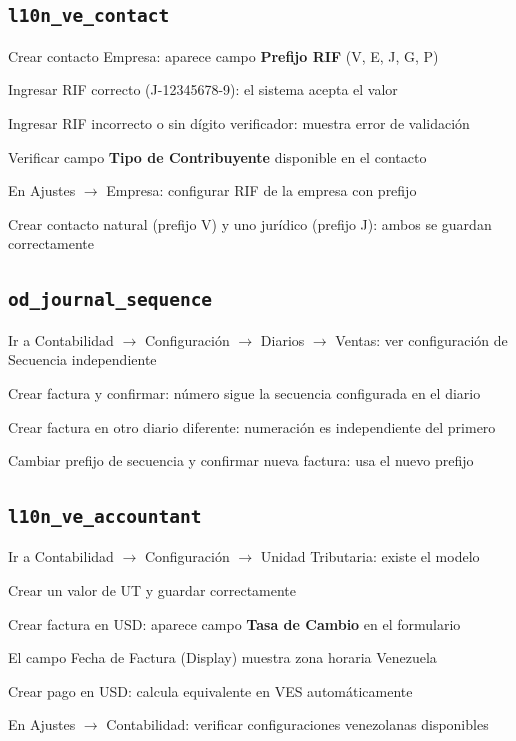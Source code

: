 \documentclass[11pt,a4paper]{article}
\newcommand{\modulo}[1]{\texttt{\textcolor{naranja}{#1}}}
\begin{document}
\begin{Form}
\subsection{\modulo{l10n\_ve\_contact}}

\begin{checklist}
  \item Crear contacto Empresa: aparece campo \textbf{Prefijo RIF} (V, E, J, G, P)
  \item Ingresar RIF correcto (J-12345678-9): el sistema acepta el valor
  \item Ingresar RIF incorrecto o sin dígito verificador: muestra error de validación
  \item Verificar campo \textbf{Tipo de Contribuyente} disponible en el contacto
  \item En Ajustes $\rightarrow$ Empresa: configurar RIF de la empresa con prefijo
  \item Crear contacto natural (prefijo V) y uno jurídico (prefijo J): ambos se guardan correctamente
\end{checklist}

\subsection{\modulo{od\_journal\_sequence}}

\begin{checklist}
  \item Ir a Contabilidad $\rightarrow$ Configuración $\rightarrow$ Diarios $\rightarrow$ Ventas: ver configuración de Secuencia independiente
  \item Crear factura y confirmar: número sigue la secuencia configurada en el diario
  \item Crear factura en otro diario diferente: numeración es independiente del primero
  \item Cambiar prefijo de secuencia y confirmar nueva factura: usa el nuevo prefijo
\end{checklist}

\subsection{\modulo{l10n\_ve\_accountant}}

\begin{checklist}
  \item Ir a Contabilidad $\rightarrow$ Configuración $\rightarrow$ Unidad Tributaria: existe el modelo
  \item Crear un valor de UT y guardar correctamente
  \item Crear factura en USD: aparece campo \textbf{Tasa de Cambio} en el formulario
  \item El campo Fecha de Factura (Display) muestra zona horaria Venezuela
  \item Crear pago en USD: calcula equivalente en VES automáticamente
  \item En Ajustes $\rightarrow$ Contabilidad: verificar configuraciones venezolanas disponibles
\end{checklist}


\end{Form}
\end{document}
